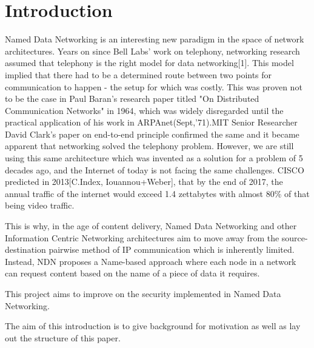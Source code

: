 \chapter{Introduction}
Named Data Networking is an interesting new paradigm in the space of network architectures. Years on since Bell Labs' work on telephony, networking research assumed that telephony is the right model for data networking[1]. This model implied that there had to be a determined route between two points for communication to happen - the setup for which was costly. This was proven not to be the case in Paul Baran's research paper titled "On Distributed Communication Networks" in 1964, which was widely disregarded until the practical application of his work in ARPAnet(Sept,'71).MIT Senior Researcher David Clark's paper on end-to-end principle confirmed the same and it became apparent that networking solved the telephony problem. However, we are still using this same architecture which was invented as a solution for a problem of 5 decades ago, and the Internet of today is not facing the same challenges. CISCO predicted in 2013[C.Index, Iouannou+Weber], that by the end of 2017, the annual traffic of the internet would exceed 1.4 zettabytes with almost 80\% of that being video traffic.

This is why, in the age of content delivery, Named Data Networking and other Information Centric Networking architectures aim to move away from the source-destination pairwise method of IP communication which is inherently limited. Instead, NDN proposes a Name-based approach where each node in a network can request content based on the name of a piece of data it requires. 

This project aims to improve on the security implemented in Named Data Networking.


The aim of this introduction is to give background for motivation as well as lay out the structure of this paper.
